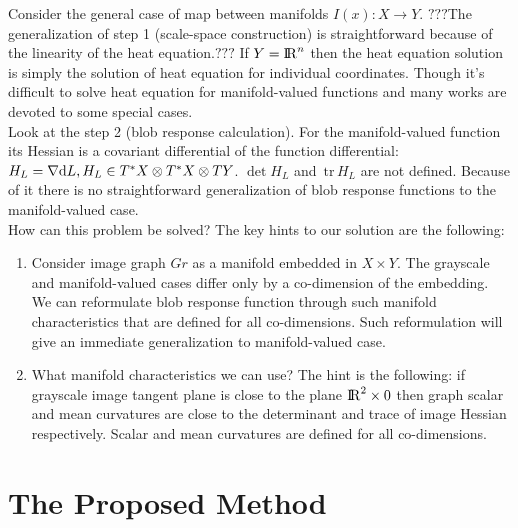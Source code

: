 \documentclass{llncs}
\newcommand{\CovariantDiff}{\nabla}
\newcommand{\Diff}{\mathrm{d}}
\newcommand{\TangentBundle}[1]{T{#1}}
\newcommand{\CotangentBundle}[1]{\tensor*{T}{^{*}}{#1}}
\newcommand {\tr}{{\,}\mathrm{tr}{\,}}
\begin{document}
Consider the general case of map between manifolds $I(x):X \to Y$. $???$The generalization of step 1 (scale-space construction) is straightforward because of the linearity of the heat equation.$???$ If $Y={\rm I\!R}^n$ then the heat equation solution is simply the solution of heat equation for individual coordinates. Though it's difficult to solve heat equation for manifold-valued functions and many works are devoted to some special cases. 
\\
Look at the step 2 (blob response calculation). For the manifold-valued function its Hessian is a covariant differential of the function differential: $H_L=\CovariantDiff \Diff L,H_L \in \CotangentBundle{X}\otimes\CotangentBundle{X}\otimes\TangentBundle{Y}$. $\det H_L$ and $\tr{H_L}$ are not defined. Because of it there is no straightforward generalization of blob response functions to the manifold-valued case. 
\\
How can this problem be solved? The key hints to our solution are the following:
\begin{enumerate}
\item	Consider image graph $Gr$ as a manifold embedded in $X\times Y$. The grayscale and manifold-valued cases differ only by a co-dimension of the embedding. We can reformulate blob response function through such manifold characteristics that are defined for all co-dimensions. Such reformulation will give an immediate generalization to manifold-valued case. 
\item	What manifold characteristics we can use? The hint is the following: if grayscale image tangent plane is close to the plane ${\rm I\!R}^2\times 0$ then graph scalar and mean curvatures are close to the determinant and trace of image Hessian respectively. Scalar and mean curvatures are defined for all co-dimensions.
\end{enumerate}

\section{The Proposed Method}
\end{document}
